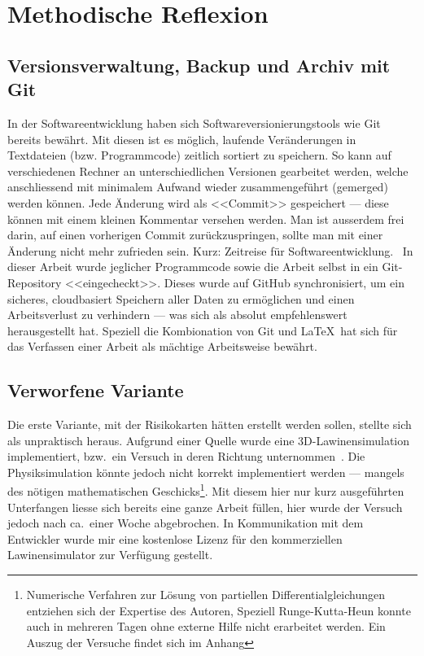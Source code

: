 \clearpage
\section{Methodische Reflexion}
\subsection{Versionsverwaltung, Backup und Archiv mit Git}

In der Softwareentwicklung haben sich Softwareversionierungstools wie Git bereits bewährt. Mit diesen ist es möglich, laufende Veränderungen in Textdateien (bzw. Programmcode) zeitlich sortiert zu speichern. So kann auf verschiedenen Rechner an unterschiedlichen Versionen gearbeitet werden, welche anschliessend mit minimalem Aufwand wieder zusammengeführt (gemerged) werden können. Jede Änderung wird als <<Commit>> gespeichert --- diese können mit einem kleinen Kommentar versehen werden. Man ist ausserdem frei darin, auf einen vorherigen Commit zurückzuspringen, sollte man mit einer Änderung nicht mehr zufrieden sein. Kurz: Zeitreise für Softwareentwicklung.~\cite{chacon2014pro}
In dieser Arbeit wurde jeglicher Programmcode sowie die Arbeit selbst in ein Git-Repository <<eingecheckt>>. Dieses wurde auf GitHub synchronisiert, um ein sicheres, cloudbasiert Speichern aller Daten zu ermöglichen und einen Arbeitsverlust zu verhindern --- was sich als absolut empfehlenswert herausgestellt hat. Speziell die Kombionation von Git und \LaTeX\ hat sich für das Verfassen einer Arbeit als mächtige Arbeitsweise bewährt.

\subsection{Verworfene Variante}

Die erste Variante, mit der Risikokarten hätten erstellt werden sollen, stellte sich als unpraktisch heraus. Aufgrund einer Quelle wurde eine 3D-Lawinensimulation implementiert, bzw.\ ein Versuch in deren Richtung unternommen\ \cite{athmaps}. Die Physiksimulation könnte jedoch nicht korrekt implementiert werden --- mangels des nötigen mathematischen Geschicks\footnote{Numerische Verfahren zur Lösung von partiellen Differentialgleichungen entziehen sich der Expertise des Autoren, Speziell Runge-Kutta-Heun konnte auch in mehreren Tagen ohne externe Hilfe nicht erarbeitet werden. Ein Auszug der Versuche findet sich im Anhang}. Mit diesem hier nur kurz ausgeführten Unterfangen liesse sich bereits eine ganze Arbeit füllen, hier wurde der Versuch jedoch nach ca.\ einer Woche abgebrochen. In Kommunikation mit dem Entwickler wurde mir eine kostenlose Lizenz für den kommerziellen Lawinensimulator  zur Verfügung gestellt.


